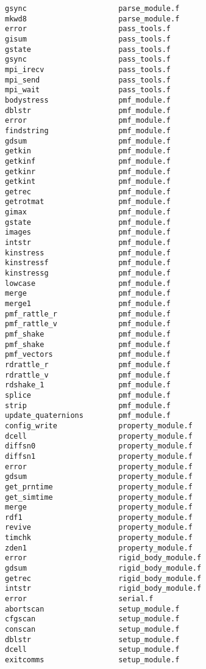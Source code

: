 \begin{verbatim}
gsync                     parse_module.f
mkwd8                     parse_module.f
error                     pass_tools.f
gisum                     pass_tools.f
gstate                    pass_tools.f
gsync                     pass_tools.f
mpi_irecv                 pass_tools.f
mpi_send                  pass_tools.f
mpi_wait                  pass_tools.f
bodystress                pmf_module.f
dblstr                    pmf_module.f
error                     pmf_module.f
findstring                pmf_module.f
gdsum                     pmf_module.f
getkin                    pmf_module.f
getkinf                   pmf_module.f
getkinr                   pmf_module.f
getkint                   pmf_module.f
getrec                    pmf_module.f
getrotmat                 pmf_module.f
gimax                     pmf_module.f
gstate                    pmf_module.f
images                    pmf_module.f
intstr                    pmf_module.f
kinstress                 pmf_module.f
kinstressf                pmf_module.f
kinstressg                pmf_module.f
lowcase                   pmf_module.f
merge                     pmf_module.f
merge1                    pmf_module.f
pmf_rattle_r              pmf_module.f
pmf_rattle_v              pmf_module.f
pmf_shake                 pmf_module.f
pmf_shake                 pmf_module.f
pmf_vectors               pmf_module.f
rdrattle_r                pmf_module.f
rdrattle_v                pmf_module.f
rdshake_1                 pmf_module.f
splice                    pmf_module.f
strip                     pmf_module.f
update_quaternions        pmf_module.f
config_write              property_module.f
dcell                     property_module.f
diffsn0                   property_module.f
diffsn1                   property_module.f
error                     property_module.f
gdsum                     property_module.f
get_prntime               property_module.f
get_simtime               property_module.f
merge                     property_module.f
rdf1                      property_module.f
revive                    property_module.f
timchk                    property_module.f
zden1                     property_module.f
error                     rigid_body_module.f
gdsum                     rigid_body_module.f
getrec                    rigid_body_module.f
intstr                    rigid_body_module.f
error                     serial.f
abortscan                 setup_module.f
cfgscan                   setup_module.f
conscan                   setup_module.f
dblstr                    setup_module.f
dcell                     setup_module.f
exitcomms                 setup_module.f

\end{verbatim}
